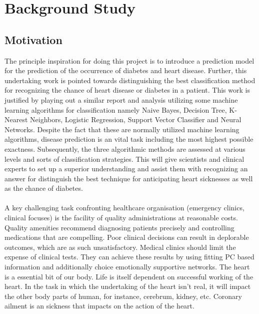 \documentclass[oneside,12pt]{Classes/VTU}
\begin{document}
    \section{Background Study}
    \subsection{Motivation}

    The principle inspiration for doing this project is to introduce a prediction model for the prediction of the occurrence of diabetes and heart disease. Further, this undertaking work is pointed towards distinguishing the best classification method for recognizing the chance of heart disease or diabetes in a patient. This work is justified by playing out a similar report and analysis utilizing some machine learning algorithms for classification namely Naive Bayes, Decision Tree, K-Nearest Neighbors, Logistic Regression, Support Vector Classifier and Neural Networks. Despite the fact that these are normally utilized machine learning algorithms, disease prediction is an vital task including the most highest possible exactness. Subsequently, the three algorithmic methods are assessed at various levels and sorts of classification strategies. This will give scientists and clinical experts to set up a superior understanding and assist them with recognizing an answer for distinguish the best technique for anticipating heart sicknesses as well as the chance of diabetes.
    \paragraph{}
    A key challenging task confronting healthcare organisation (emergency clinics, clinical focuses) is the facility of quality administrations at reasonable costs. Quality amenities recommend diagnosing patients precisely and controlling medications that are compelling. Poor clinical decisions can result in deplorable outcomes, which are as such unsatisfactory. Medical clinics should limit the expense of clinical tests. They can achieve these results by using fitting PC based information and additionally choice emotionally supportive networks. The heart is a essential bit of our body. Life is itself dependent on successful working of the heart. In the task in which the undertaking of the heart isn't real, it will impact the other body parts of human, for instance, cerebrum, kidney, etc. Coronary ailment is an sickness that impacts on the action of the heart.
\end{document}
